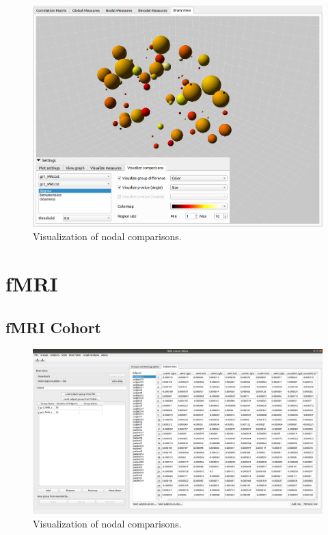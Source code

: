 \documentclass{article}
\begin{document}
\begin{figure}[h]
    \centering
    \includegraphics[width=\linewidth]{comparison_vis.png}
    \caption{Visualization of nodal comparisons.}
    \label{fig:comparison_vis}
\end{figure}

\section{fMRI}

\subsection{fMRI Cohort}

\begin{figure}[h]
    \centering
    \includegraphics[width=\linewidth]{fmri_cohort.png}
    \caption{Visualization of nodal comparisons.}
    \label{fig:fmri_cohort}
\end{figure}
\end{document}
